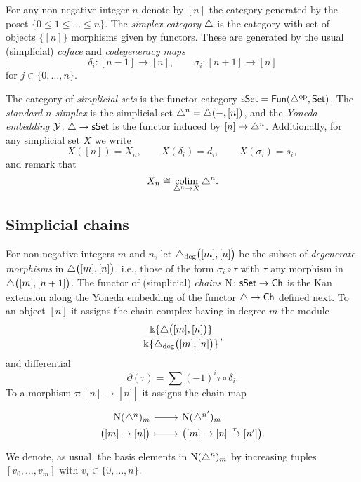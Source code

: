 	For any non-negative integer $n$ denote by $[n]$ the category generated by the poset $\{0 \leq 1 \leq \dots \leq n\}$.
	The \textit{simplex category} $\triangle$ is the category with set of objects $\big\{ [n] \big\}$ morphisms given by functors.
	These are generated by the usual (simplicial) \textit{coface} and \textit{codegeneracy maps}
	\begin{equation*}
	\delta_i \colon [n-1] \to [n], \qquad \sigma_i \colon [n+1] \to [n]
	\end{equation*}
	for $j \in \{0, \dots, n\}$.
	
	The category of \textit{simplicial sets} is the functor category $\mathsf{sSet} = \mathsf{Fun}(\triangle^{\mathrm{op}}, \mathsf{Set})$.
	The \textit{standard $n$-simplex} is the simplicial set $\triangle^n = \triangle(-, [n])$, and the \textit{Yoneda embedding} $\operatorname{\mathcal{Y}} \colon \triangle \to \mathsf{sSet}$ is the functor induced by $[n] \mapsto \triangle^n$.
	Additionally, for any simplicial set $X$ we write
	\begin{equation*}
	X([n]) = X_n, \qquad
	X(\delta_i) = d_i, \qquad
	X(\sigma_i) = s_i,
	\end{equation*}
	and remark that
	\begin{equation*}
	X_n \cong \operatorname*{colim}_{\triangle^n \to X} \triangle^n.
	\end{equation*}
	
	\subsection{Simplicial chains} \label{ss:simplicial sets}
	
	For non-negative integers $m$ and $n$, let $\triangle_{\deg} \big( [m], [n] \big)$ be the subset of \textit{degenerate morphisms} in $\triangle \big( [m], [n] \big)$, i.e., those of the form $\sigma_i \circ \tau$ with $\tau$ any morphism in $\triangle \big( [m], [n+1] \big)$.
	The functor of (simplicial) \textit{chains} $\operatorname{N} \colon \mathsf{sSet} \to \mathsf{Ch}$ is the Kan extension along the Yoneda embedding of the functor $\triangle \to \mathsf{Ch}$ defined next.
	To an object $[n]$ it assigns the chain complex having in degree $m$ the module
	\begin{equation*}
	\frac{\Bbbk\{\triangle \big( [m], [n] \big) \}}{\Bbbk\{\triangle_{\deg} \big( [m], [n] \big) \}},
	\end{equation*}
	and differential
	\begin{equation*}
	\partial(\tau) = \sum (-1)^i \tau \circ \delta_i.
	\end{equation*}
	To a morphism $\tau \colon [n] \to [n^\prime]$ it assigns the chain map
	\begin{equation*}
	\begin{tikzcd}[row sep=-3pt, column sep=normal,
	/tikz/column 1/.append style={anchor=base east},
	/tikz/column 2/.append style={anchor=base west}]
	\chains(\simplex^n)_m \arrow[r] &  \chains(\simplex^{n^\prime})_m \\
	\big( [m] \to [n] \big) \arrow[r, mapsto] & \big( [m] \to [n] \xra{\tau} [n^\prime] \big).
	\end{tikzcd}
	\end{equation*}
	We denote, as usual, the basis elements in $\operatorname{N}(\triangle^n)_m$ by increasing tuples $[v_0, \dots, v_m]$ with $v_i \in \{0, \dots, n\}$.